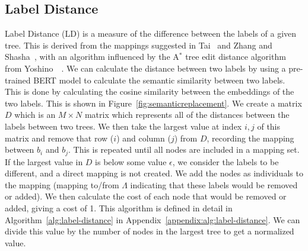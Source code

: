 


\subsection{Label Distance}
\label{ssec:label-distance}

Label Distance (LD) is a measure of the difference between the labels of a given tree. This is derived from the mappings suggested in Tai~\cite{tai_tree--tree_1979} and Zhang and Shasha~\cite{Zhang_Shasha_1989}, with an algorithm influenced by the A$^*$ tree edit distance algorithm from Yoshino~\etal~\cite{yoshino_dynamic_2013}. We can calculate the distance between two labels by using a pre-trained BERT model to calculate the semantic similarity between two labels. This is done by calculating the cosine similarity between the embeddings of the two labels. This is shown in Figure~\ref{fig:semanticreplacement}. We create a matrix $D$ which is an $M \times N$ matrix which represents all of the distances between the labels between two trees. We then take the largest value at index $i, j$ of this matrix and remove that row ($i$) and column ($j$) from $D$, recording the mapping between $b_i$ and $b_j$. This is repeated until all nodes are included in a mapping set. If the largest value in $D$ is below some value $\epsilon$, we consider the labels to be different, and a direct mapping is not created. We add the nodes as individuals to the mapping (mapping to/from $\Lambda$ indicating that these labels would be removed or added). We then calculate the cost of each node that would be removed or added, giving a cost of 1. This algorithm is defined in detail in Algorithm~\ref{alg:label-distance} in Appendix~\ref{appendix:alg:label-distance}. We can divide this value by the number of nodes in the largest tree to get a normalized value.



